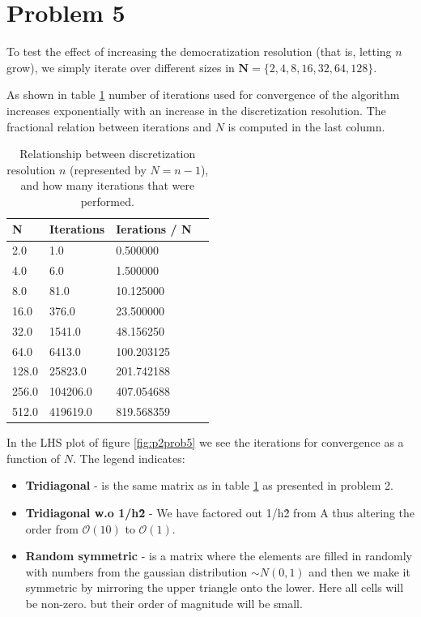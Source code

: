 \documentclass[final, 3p, times, 11.5pt]{article}
\begin{document}
\section{Problem 5}

To test the effect of increasing the democratization resolution (that is, letting $n$ grow), we simply iterate over different sizes in $\mathbf{N} = \{2, 4, 8, 16, 32, 64, 128\}$. 

As shown in table \ref{tab:conv} number of iterations used for convergence of the algorithm increases exponentially with an increase in the discretization resolution. The fractional relation between iterations and $N$ is computed in the last column.

\begin{table}[h!]
    \centering
    \caption{Relationship between discretization resolution $n$ (represented by $N = n-1$),  and how many iterations that were performed. }
    \begin{tabular}{llll}
    \hline
    N & Iterations & Ierations / N \\ \hline \hline
2.0 & 1.0 & 0.500000 \\
4.0 & 6.0 & 1.500000 \\
8.0 & 81.0 & 10.125000 \\
16.0 & 376.0 & 23.500000 \\
32.0 & 1541.0 & 48.156250 \\
64.0 & 6413.0 & 100.203125 \\
128.0 & 25823.0 & 201.742188 \\
256.0 & 104206.0 & 407.054688 \\
512.0 & 419619.0 & 819.568359 \\ \hline
    \end{tabular}
    \label{tab:conv}
\end{table}

In the LHS plot of figure \ref{fig:p2prob5} we see the iterations for convergence as a function of $N$. The  legend indicates:
\begin{itemize}
    \item \textbf{Tridiagonal} - is the same matrix as in table \ref{tab:conv} as presented in problem 2.
    \item \textbf{Tridiagonal w.o 1/h\^ 2} - We have factored out 1/h\^ 2 from A thus altering the order from $\mathcal{O}(10)$ to $\mathcal{O}(1)$.
    \item \textbf{Random symmetric} - is a matrix where the elements are filled in randomly with numbers from the gaussian distribution $\sim N(0, 1)$ and then we make it symmetric by mirroring the upper triangle onto the lower. Here all cells will be non-zero. but their order of magnitude will be small.
\end{itemize}
\end{document}
